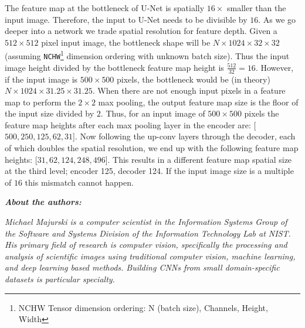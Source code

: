 \documentclass[10pt, indentfirst]{article}
\begin{document}
The feature map at the bottleneck of U-Net is spatially $16 \times$ smaller than the input image.
Therefore, the input to U-Net needs to be divisible by $16$.
As we go deeper into a network we trade spatial resolution for feature depth.
Given a $512 \times 512$ pixel input image, the bottleneck shape will be $N \times 1024 \times 32 \times 32$ (assuming \texttt{NCHW}\footnote{NCHW Tensor dimension ordering: N (batch size), Channels, Height, Width} dimension ordering with unknown batch size).
Thus the input image height divided by the bottleneck feature map height is $\frac{512}{32} = 16$.
However, if the input image is $500 \times 500$ pixels, the bottleneck would be (in theory) $N \times 1024 \times 31.25 \times 31.25$.
When there are not enough input pixels in a feature map to perform the $2 \times 2$ max pooling, the output feature map size is the floor of the input size divided by $2$.
Thus, for an input image of $500 \times 500$ pixels the feature map heights after each max pooling layer in the encoder are: [$500, 250, 125, 62, 31$].
Now following the up-conv layers through the decoder, each of which doubles the spatial resolution, we end up with the following feature map heights: [$31, 62, 124, 248, 496$].
This results in a different feature map spatial size at the third level; encoder 125, decoder 124.
If the input image size is a multiple of $16$ this mismatch cannot happen.

\vspace{20pt}



\renewcommand{\bibname}{References}


{
	\footnotesize

} 


\vspace{20pt} 

\noindent\textit{\textbf{About the authors:}}

\noindent\textit{Michael Majurski is a computer scientist in the Information Systems Group of the Software and Systems Division of the Information Technology Lab at NIST.
	His primary field of research is computer vision, specifically the processing and analysis of scientific images using traditional computer vision, machine learning, and deep learning based methods.
	Building CNNs from small domain-specific datasets is particular specialty.}
\end{document}
